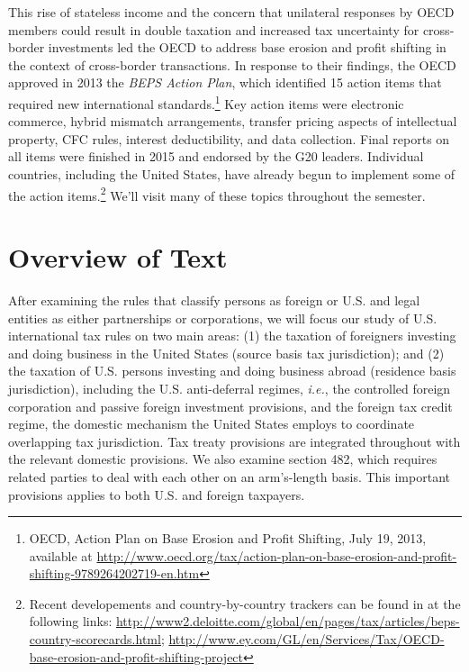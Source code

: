 This rise of stateless income and the concern that unilateral responses by OECD members could result in double taxation  and increased tax uncertainty for cross-border investments led the OECD to address base erosion and profit shifting in the context of cross-border transactions.  In response to their findings, the OECD approved in 2013 the \emph{BEPS Action Plan}, which identified 15 action items that required new international standards.\footnote{OECD, Action Plan on Base Erosion and Profit Shifting, July 19, 2013, available at \url{http://www.oecd.org/tax/action-plan-on-base-erosion-and-profit-shifting-9789264202719-en.htm}}  Key action items were electronic commerce, hybrid mismatch arrangements, transfer pricing aspects of intellectual property, CFC rules, interest deductibility, and data collection.  Final reports on all items were finished in 2015 and endorsed by the G20 leaders.  Individual countries, including the United States, have already begun to implement some of the action items.\footnote{Recent developements and country-by-country trackers can be found in at the following links:   \url{http://www2.deloitte.com/global/en/pages/tax/articles/beps-country-scorecards.html}; \url{http://www.ey.com/GL/en/Services/Tax/OECD-base-erosion-and-profit-shifting-project} } We'll visit many of these topics throughout the semester.

 

\section{Overview of Text}
After examining the rules that classify persons as foreign or U.S. and legal entities as either partnerships or corporations, we will focus our study of U.S. international tax rules on two main areas: (1)  the taxation of foreigners investing and doing business in the United States (source basis tax jurisdiction); and (2) the taxation of U.S. persons investing and doing business abroad (residence basis jurisdiction), including the U.S. anti-deferral regimes, \emph{i.e.}, the controlled foreign corporation and passive foreign investment provisions, and the foreign tax credit regime, the domestic mechanism the United States employs to coordinate overlapping tax jurisdiction.  Tax treaty provisions are integrated throughout with the relevant domestic provisions.  We also examine section 482, which requires related parties to deal with each other on an arm's-length basis.  This important provisions applies to both U.S. and foreign taxpayers.  

